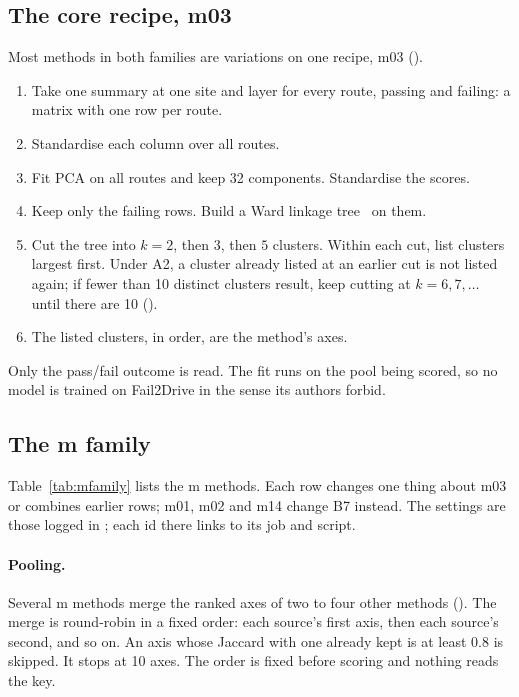 \subsection{The core recipe, m03}
\label{sec:m03}

Most methods in both families are variations on one recipe, m03
().
\begin{enumerate}
  \item Take one summary at one site and layer for every route, passing and
        failing: a matrix with one row per route.
  \item Standardise each column over all routes.
  \item Fit PCA on all routes and keep 32 components. Standardise the scores.
  \item Keep only the failing rows. Build a Ward linkage
        tree~\cite{ward1963hierarchical} on them.
  \item Cut the tree into $k=2$, then $3$, then $5$ clusters. Within each cut,
        list clusters largest first. Under A2, a cluster already listed at an
        earlier cut is not listed again; if fewer than 10 distinct clusters
        result, keep cutting at $k=6, 7, \dots$ until there are 10
        ().
  \item The listed clusters, in order, are the method's axes.
\end{enumerate}
Only the pass/fail outcome is read. The fit runs on the pool being scored, so no
model is trained on Fail2Drive in the sense its authors forbid.

\subsection{The m family}
\label{sec:mfamily}

Table~\ref{tab:mfamily} lists the m methods. Each row changes one thing about
m03 or combines earlier rows; m01, m02 and m14 change B7 instead. The settings are those logged in
; each id there links to its job and script.

\paragraph{Pooling.}
Several m methods merge the ranked axes of two to four other methods
(). The merge is round-robin in a fixed order: each source's
first axis, then each source's second, and so on. An axis whose Jaccard with one
already kept is at least 0.8 is skipped. It stops at 10 axes. The order is fixed
before scoring and nothing reads the key.

